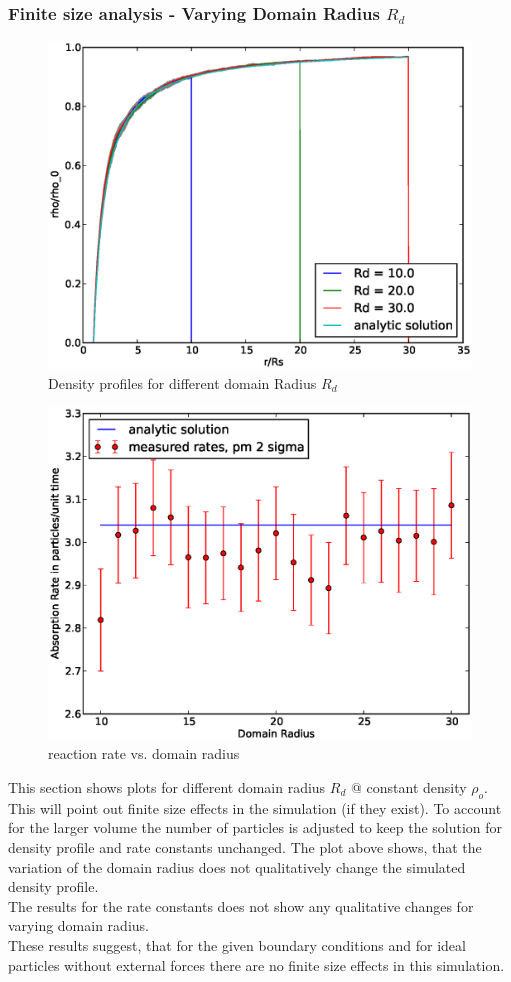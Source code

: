 \subsubsection{Finite size analysis - Varying Domain Radius $R_d$}
\begin{figure}[H]
    \centering
    \includegraphics[width = .8 \textwidth]{plots/np/rd/rho_over_rho0.eps}
    \caption{Density profiles for different domain Radius $R_d$}
    \label{fig:ror0Rd}
\end{figure}
\begin{figure}
    \centering
    \includegraphics[width = .56 \textwidth]{plots/np/rd/KabsRd.eps}
    \caption{reaction rate vs. domain radius}
    \label{fig:KrelRd}
\end{figure}
This section shows plots for different domain radius $R_d$ @ constant density $\rho_o$.
This will point out finite size effects in the simulation (if they exist). To account for the larger volume the number of particles is adjusted to keep the solution for density profile and rate constants unchanged.
The plot above shows, that the variation of the domain radius does not qualitatively change the simulated density profile. \\
The results for the rate constants does not show any qualitative changes for varying domain radius. \\
These results suggest, that for the given boundary conditions and for ideal particles without external forces there are no finite size effects in this simulation.
